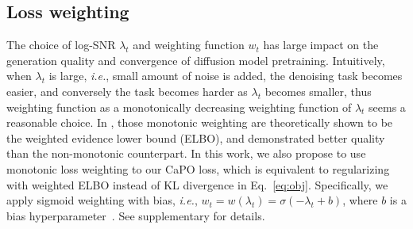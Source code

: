 \subsection{Loss weighting}\label{sec:adv}
The choice of log-SNR $\lambda_t$ and weighting function $w_t$ has large impact on the generation quality and convergence of diffusion model pretraining.
Intuitively, when $\lambda_t$ is large, \emph{i.e.}, small amount of noise is added, the denoising task becomes easier, and conversely the task becomes harder as $\lambda_t$ becomes smaller, thus weighting function as a monotonically decreasing weighting function of $\lambda_t$ seems a reasonable choice. 
In \citep{kingma2023understanding}, those monotonic weighting are theoretically shown to be the weighted evidence lower bound (ELBO), and demonstrated better quality than the non-monotonic counterpart.
In this work, we also propose to use monotonic loss weighting to our CaPO loss, which is equivalent to regularizing with weighted ELBO instead of KL divergence in Eq.~\eqref{eq:obj}. 
Specifically, we apply sigmoid weighting with bias, \emph{i.e.}, $w_t = w(\lambda_t) = \sigma(-\lambda_t + b)$, where $b$ is a bias hyperparameter~\citep{kingma2023understanding, hoogeboom2024simpler}. See supplementary for details.






